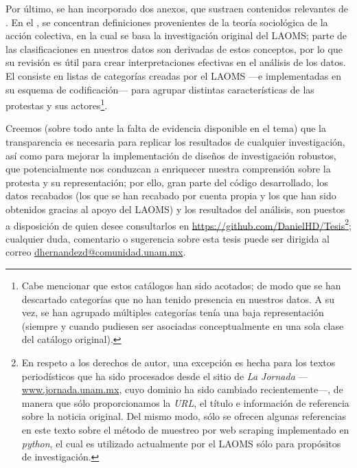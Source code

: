 \documentclass[letterpaper, 11pt]{book}
\theoremstyle{definition}
\theoremstyle{remark}
\begin{document}
Por último, se han incorporado dos anexos, que sustraen contenidos relevantes de \citet{2017_Cadena_ManualLAOMS}. 
En el , se concentran definiciones provenientes de la teoría sociológica de la acción colectiva, en la cual se basa la investigación original del LAOMS; parte de las clasificaciones en nuestros datos son derivadas de estos conceptos, por lo que su revisión es útil para crear interpretaciones efectivas en el análisis de los datos. 
El  consiste en listas de categorías creadas por el LAOMS ---e implementadas en su esquema de codificación--- para agrupar distintas características de las protestas y sus actores\footnote{
    Cabe mencionar que estos catálogos han sido acotados; de modo que se han descartado categorías que no han tenido presencia en nuestros datos. 
    A su vez, se han agrupado múltiples categorías tenía una baja representación (siempre y cuando pudiesen ser asociadas conceptualmente en una sola clase del catálogo original). 
}.


Creemos (sobre todo ante la falta de evidencia disponible en el tema) que la transparencia es necesaria para replicar los resultados de cualquier investigación, así como para mejorar la implementación de diseños de investigación robustos, que potencialmente nos conduzcan a enriquecer nuestra comprensión sobre la protesta y su representación; por ello, gran parte del código desarrollado, los datos recabados (los que se han recabado por cuenta propia y los que han sido obtenidos gracias al apoyo del LAOMS) y los resultados del análisis, son puestos a disposición de quien desee consultarlos en \url{https://github.com/DanielHD/Tesis}\footnote{
    En respeto a los derechos de autor, una excepción es hecha para los textos periodísticos que ha sido procesados desde el sitio de \emph{La Jornada} ---\url{www.jornada.unam.mx}, cuyo dominio ha sido cambiado recientemente---, de manera que sólo proporcionamos la \emph{URL}, el título e información de referencia sobre la noticia original. 
    Del mismo modo, sólo se ofrecen algunas referencias en este texto sobre el método de muestreo por web scraping implementado en \emph{python}, el cual es utilizado actualmente por el LAOMS sólo para propósitos de investigación. 
}; cualquier duda, comentario o sugerencia sobre esta tesis puede ser dirigida al correo \href{mailto:dhernandezd@comunidad.unam.mx}{dhernandezd@comunidad.unam.mx}.






\mainmatter 
\end{document}
